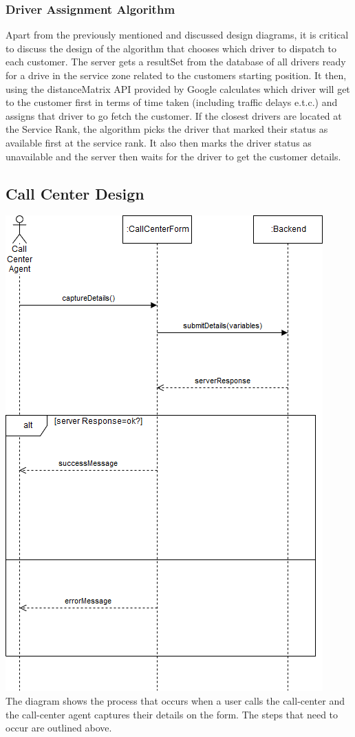\documentclass[a4paper,12pt]{article}
\begin{document}
\subsubsection{Driver Assignment Algorithm}
Apart from the previously mentioned and discussed design diagrams, it is critical to discuss the design of the algorithm that chooses which driver to dispatch to each customer. The server gets a resultSet from the database of all drivers ready for a drive in the service zone related to the customers starting position. It then, using the distanceMatrix API provided by Google calculates which driver will get to the customer first in terms of time taken (including traffic delays e.t.c.) and assigns that driver to go fetch the customer. If the closest drivers are located at the Service Rank, the algorithm picks the driver that marked their status as available first at the service rank. It also then marks the driver status as unavailable and the server then waits for the driver to get the customer details.
\newpage
\subsection{Call Center Design}
\includegraphics[scale=0.5]{CallCenterSequence}\\
The diagram shows the process that occurs when a user calls the call-center and the call-center agent captures their details on the form. The steps that need to occur are outlined above.
\newpage
\end{document}
